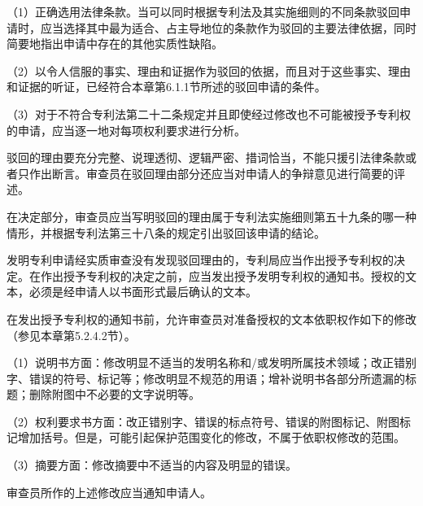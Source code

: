 {\setlength{\parindent}{17.1bp}（1）正确选用法律条款。当可以同时根据专利法及其实施细则的不同条款驳回申请时，应当选择其中最为适合、占主导地位的条款作为驳回的主要法律依据，同时简要地指出申请中存在的其他实质性缺陷。\par}

{\setlength{\parindent}{17.1bp}（2）以令人信服的事实、理由和证据作为驳回的依据，而且对于这些事实、理由和证据的听证，已经符合本章第6.1.1节所述的驳回申请的条件。\par}

{\setlength{\parindent}{17.1bp}（3）对于不符合专利法第二十二条规定并且即使经过修改也不可能被授予专利权的申请，应当逐一地对每项权利要求进行分析。\par}

驳回的理由要充分完整、说理透彻、逻辑严密、措词恰当，不能只援引法律条款或者只作出断言。审查员在驳回理由部分还应当对申请人的争辩意见进行简要的评述。

在决定部分，审查员应当写明驳回的理由属于专利法实施细则第五十九条的哪一种情形，并根据专利法第三十八条的规定引出驳回该申请的结论。

发明专利申请经实质审查没有发现驳回理由的，专利局应当作出授予专利权的决定。在作出授予专利权的决定之前，应当发出授予发明专利权的通知书。授权的文本，必须是经申请人以书面形式最后确认的文本。

在发出授予专利权的通知书前，允许审查员对准备授权的文本依职权作如下的修改（参见本章第5.2.4.2节）。

{\setlength{\parindent}{17.1bp}（1）说明书方面：修改明显不适当的发明名称和/或发明所属技术领域；改正错别字、错误的符号、标记等；修改明显不规范的用语；增补说明书各部分所遗漏的标题；删除附图中不必要的文字说明等。\par}

{\setlength{\parindent}{17.1bp}（2）权利要求书方面：改正错别字、错误的标点符号、错误的附图标记、附图标记增加括号。但是，可能引起保护范围变化的修改，不属于依职权修改的范围。\par}

{\setlength{\parindent}{17.1bp}（3）摘要方面：修改摘要中不适当的内容及明显的错误。\par}

审查员所作的上述修改应当通知申请人。

